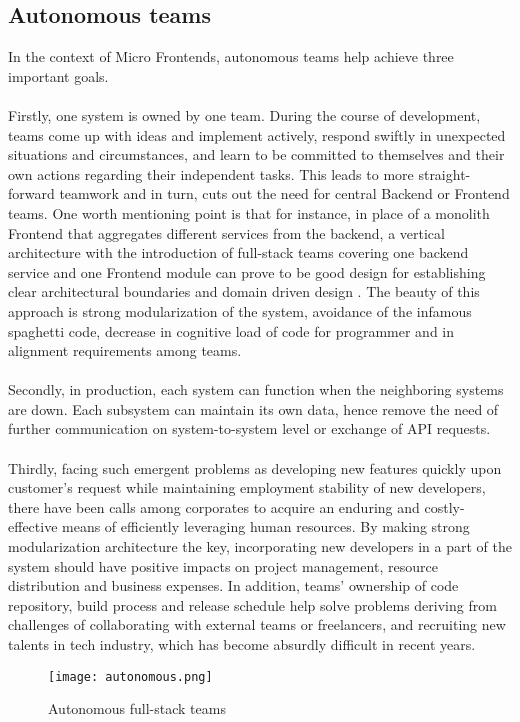 \documentclass[a4paper]{book}
\begin{document}
\subsection{Autonomous teams}

In the context of Micro Frontends, autonomous teams help achieve three important goals.
\\ \\
Firstly, one system is owned by one team. During the course of development, teams come up with ideas and implement actively, respond swiftly in unexpected situations and circumstances, and learn to be committed to themselves and their own actions regarding their independent tasks. This leads to more straight-forward teamwork and in turn, cuts out the need for central Backend or Frontend teams. One worth mentioning point is that for instance, in place of a monolith Frontend that aggregates different services from the backend, a vertical architecture with the introduction of full-stack teams covering one backend service and one Frontend module can prove to be good design for establishing clear architectural boundaries and domain driven design \cite{DDD}. The beauty of this approach is strong modularization of the system, avoidance of the infamous spaghetti code, decrease in cognitive load of code for programmer and in alignment requirements among teams.
\\ \\
Secondly, in production, each system can function when the neighboring systems are down. Each subsystem can maintain its own data, hence remove the need of further communication on system-to-system level or exchange of API requests.
\\ \\
Thirdly, facing such emergent problems as developing new features quickly upon customer’s request while maintaining employment stability of new developers, there have been calls among corporates to acquire an enduring and costly-effective means of efficiently leveraging human resources. By making strong modularization architecture the key, incorporating new developers in a part of the system should have positive impacts on project management, resource distribution and business expenses. In addition, teams’ ownership of code repository, build process and release schedule help solve problems deriving from challenges of collaborating with external teams or freelancers, and recruiting new talents in tech industry, which has become absurdly difficult in recent years.
\clearpage
\begin{figure}
    \centering
    \texttt{[image: autonomous.png]}
    \caption{Autonomous full-stack teams \cite{Gee20}}
    \label{fig:my_label}
\end{figure}
\end{document}
